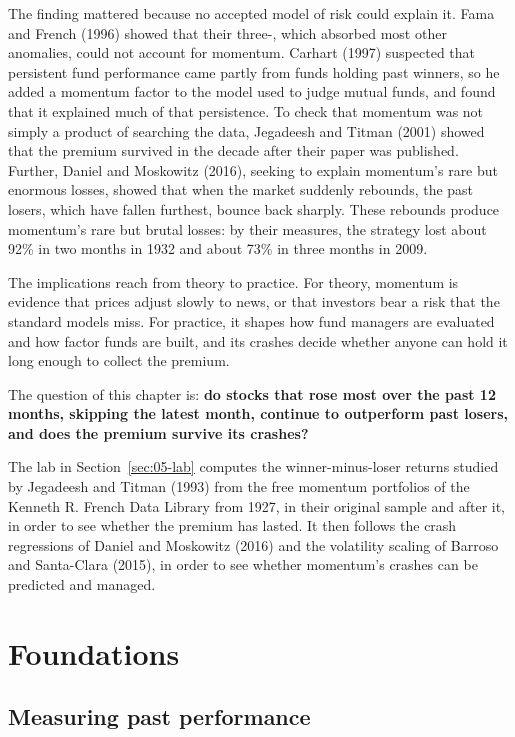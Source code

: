 The finding mattered because no accepted model of risk could explain it. Fama and French (1996) showed that their three-, which absorbed most other anomalies, could not account for momentum. Carhart (1997) suspected that persistent fund performance came partly from funds holding past winners, so he added a momentum factor to the model used to judge mutual funds, and found that it explained much of that persistence. To check that momentum was not simply a product of searching the data, Jegadeesh and Titman (2001) showed that the premium survived in the decade after their paper was published. Further,
Daniel and Moskowitz (2016), seeking to explain momentum's rare but enormous losses, showed that when the market suddenly rebounds, the past losers, which have fallen furthest, bounce back sharply. These rebounds produce momentum's rare but brutal losses: by their measures, the strategy lost about 92\% in two months in 1932 and about 73\% in three months in 2009.

The implications reach from theory to practice. For theory, momentum is evidence that prices adjust slowly to news, or that investors bear a risk that the standard models miss. For practice, it shapes how fund managers are evaluated and how factor funds are built, and its crashes decide whether anyone can hold it long enough to collect the premium. 

The question of this chapter is: \textbf{do stocks that rose most over the past 12 months, skipping the latest month, continue to outperform past losers, and does the premium survive its crashes?}

The lab in Section~\ref{sec:05-lab} computes the winner-minus-loser returns studied by Jegadeesh and Titman (1993) from the free momentum portfolios of the Kenneth R. French Data Library from 1927, in their original sample and after it, in order to see whether the premium has lasted. It then follows the crash regressions of Daniel and Moskowitz (2016) and the volatility scaling of Barroso and Santa-Clara (2015), in order to see whether momentum's crashes can be predicted and managed.


\section{Foundations}
\label{sec:05-foundations}

\subsection{Measuring past performance}


